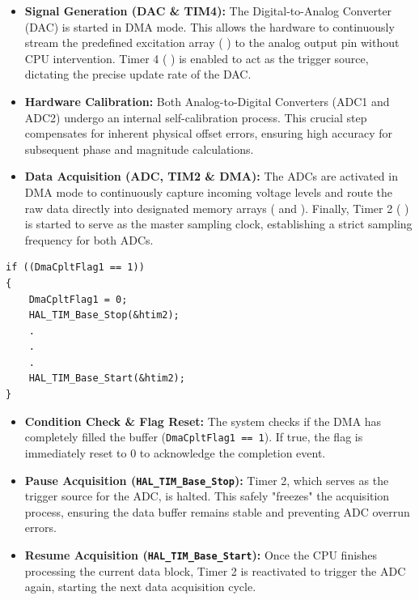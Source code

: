 \begin{itemize}

    \item \textbf{Signal Generation (DAC \& TIM4):} The Digital-to-Analog Converter (DAC) is started in DMA mode. This allows the hardware to continuously stream the predefined excitation array (  ) to the analog output pin without CPU intervention. Timer 4 (  ) is enabled to act as the trigger source, dictating the precise update rate of the DAC.

    \item \textbf{Hardware Calibration:} Both Analog-to-Digital Converters (ADC1 and ADC2) undergo an internal self-calibration process. This crucial step compensates for inherent physical offset errors, ensuring high accuracy for subsequent phase and magnitude calculations.

    \item \textbf{Data Acquisition (ADC, TIM2 \& DMA):} The ADCs are activated in DMA mode to continuously capture incoming voltage levels and route the raw data directly into designated memory arrays (  and  ). Finally, Timer 2 (  ) is started to serve as the master sampling clock, establishing a strict sampling frequency for both ADCs.

\end{itemize}
\vspace{1.5cm}
\begin{lstlisting}
if ((DmaCpltFlag1 == 1))
{
    DmaCpltFlag1 = 0;
    HAL_TIM_Base_Stop(&htim2);
    .
    .
    .
    HAL_TIM_Base_Start(&htim2);
}
\end{lstlisting}

\begin{itemize}
    \item \textbf{Condition Check \& Flag Reset:} The system checks if the DMA has completely filled the buffer (\texttt{DmaCpltFlag1 == 1}). If true, the flag is immediately reset to 0 to acknowledge the completion event.

    \item \textbf{Pause Acquisition (\texttt{HAL\_TIM\_Base\_Stop}):} Timer 2, which serves as the trigger source for the ADC, is halted. This safely "freezes" the acquisition process, ensuring the data buffer remains stable and preventing ADC overrun errors.

    \item \textbf{Resume Acquisition (\texttt{HAL\_TIM\_Base\_Start}):} Once the CPU finishes processing the current data block, Timer 2 is reactivated to trigger the ADC again, starting the next data acquisition cycle.
\end{itemize}

